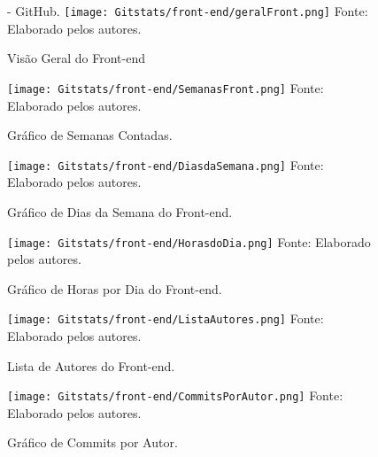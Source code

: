 \documentclass[
    12pt,               %
    openright,          %
    oneside,
    a4paper,            %
    BIBLATEX,           %
    TODO,               %
    english,            %
    brazil              %
    ]{ifsp-spo-inf-ctds}
\begin{document}
        \begin{figure}[H]
                \centering
                \caption{Visão Geral do Front-end} - GitHub.
                \texttt{[image: Gitstats/front-end/geralFront.png]}
                {\footnotesize Fonte: Elaborado pelos autores.}
                \label{fig:geralFront}
        \end{figure}     

        \begin{figure}[H]
                \centering
                \caption{Gráfico de Semanas Contadas.}
                \texttt{[image: Gitstats/front-end/SemanasFront.png]}
                {\footnotesize Fonte: Elaborado pelos autores.}
                \label{fig:semanasFront}
        \end{figure}    

        \begin{figure}[H]
                \centering
                \caption{Gráfico de Dias da Semana do  Front-end.}
                \texttt{[image: Gitstats/front-end/DiasdaSemana.png]}
                {\footnotesize Fonte: Elaborado pelos autores.}
                \label{fig:diasemanaFront}
        \end{figure}  

        \begin{figure}[H]
                \centering
                \caption{Gráfico de Horas por Dia do Front-end.}
                \texttt{[image: Gitstats/front-end/HorasdoDia.png]}
                {\footnotesize Fonte: Elaborado pelos autores.}
                \label{fig:horasFront}
        \end{figure} 

        \begin{figure}[H]
                \centering
                \caption{Lista de Autores do
                Front-end.}
                \texttt{[image: Gitstats/front-end/ListaAutores.png]}
                {\footnotesize Fonte: Elaborado pelos autores.}
                \label{fig:autorFront}
        \end{figure}   

        \begin{figure}[H]
                \centering
                \caption{Gráfico de Commits por Autor.}
                \texttt{[image: Gitstats/front-end/CommitsPorAutor.png]}
                {\footnotesize Fonte: Elaborado pelos autores.}
                \label{fig:commitFront}
        \end{figure}   
\end{document}
